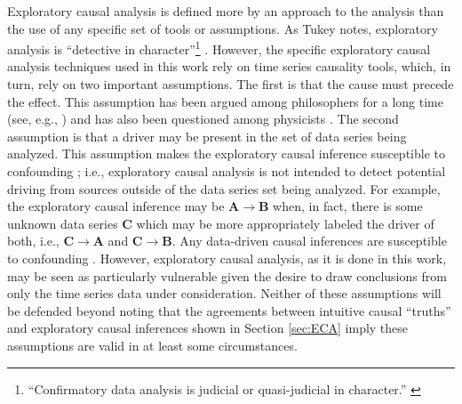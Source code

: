 \documentclass{article}[10pt]
\begin{document}
Exploratory causal analysis is defined more by an approach to the analysis than the use of any specific set of tools or assumptions.  As Tukey notes, exploratory analysis is ``detective in character''\footnote{``Confirmatory data analysis is judicial or quasi-judicial in character.'' \cite{Tukey1977}} \cite{Tukey1977}.  However, the specific exploratory causal analysis techniques used in this work rely on time series causality tools, which, in turn, rely on two important assumptions.  The first is that the cause must precede the effect.  This assumption has been argued among philosophers for a long time (see, e.g., \cite{Russell1912,Russell1948,Salmon1984,Reichenbach2001,Illari2014,Pearl2000}) and has also been questioned among physicists \cite{Bohm1971,Bunge1979}.  The second assumption is that a driver may be present in the set of data series being analyzed.  This assumption makes the exploratory causal inference susceptible to confounding \cite{Illari2014,Pearl2000}; i.e., exploratory causal analysis is not intended to detect potential driving from sources outside of the data series set being analyzed.  For example, the exploratory causal inference may be $\mathbf{A}\rightarrow\mathbf{B}$ when, in fact, there is some unknown data series $\mathbf{C}$ which may be more appropriately labeled the driver of both, i.e., $\mathbf{C}\rightarrow\mathbf{A}$ and $\mathbf{C}\rightarrow\mathbf{B}$.  Any data-driven causal inferences are susceptible to confounding \cite{Illari2014}.  However, exploratory causal analysis, as it is done in this work, may be seen as particularly vulnerable given the desire to draw conclusions from only the time series data under consideration.  Neither of these assumptions will be defended beyond noting that the agreements between intuitive causal ``truths'' and exploratory causal inferences shown in Section \ref{sec:ECA} imply these assumptions are valid in at least some circumstances.
\end{document}
